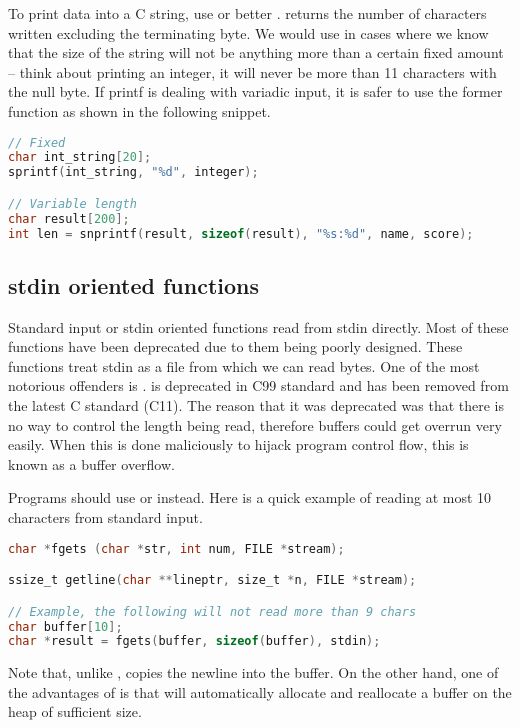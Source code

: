 To print data into a C string, use  or better .
 returns the number of characters written excluding the terminating byte.
We would use  in cases where we know that the size of the string will not be anything more than a certain fixed amount -- think about printing an integer, it will never be more than 11 characters with the null byte.
If printf is dealing with variadic input, it is safer to use the former function as shown in the following snippet.

\begin{lstlisting}[language=C]
// Fixed
char int_string[20];
sprintf(int_string, "%d", integer);

// Variable length
char result[200];
int len = snprintf(result, sizeof(result), "%s:%d", name, score);
\end{lstlisting}

\subsection{stdin oriented functions}

Standard input or stdin oriented functions read from stdin directly.
Most of these functions have been deprecated due to them being poorly designed. These functions treat stdin as a file from which we can read bytes.
One of the most notorious offenders is .
 is deprecated in C99 standard and has been removed from the latest C standard (C11).
The reason that it was deprecated was that there is no way to control the length being read, therefore buffers could get overrun very easily.
When this is done maliciously to hijack program control flow, this is known as a buffer overflow.

Programs should use  or  instead.
Here is a quick example of reading at most 10 characters from standard input.

\begin{lstlisting}[language=C]
char *fgets (char *str, int num, FILE *stream);

ssize_t getline(char **lineptr, size_t *n, FILE *stream);

// Example, the following will not read more than 9 chars
char buffer[10];
char *result = fgets(buffer, sizeof(buffer), stdin);
\end{lstlisting}

Note that, unlike ,  copies the newline into the buffer.
On the other hand, one of the advantages of  is that will automatically allocate and reallocate a buffer on the heap of sufficient size.

